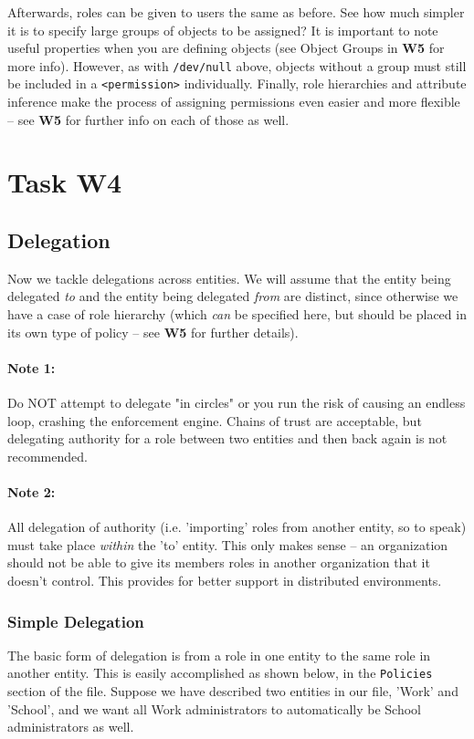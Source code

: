 \documentclass{article}
\providecommand{\task}[1]{\section{Task #1}}
\providecommand{\inlinecode}{\texttt}
\begin{document}
Afterwards, roles can be given to users the same as before. See how much simpler it is to specify large groups of objects to be assigned? It is important to note useful properties when you are defining objects (see Object Groups in \textbf{W5} for more info). However, as with \inlinecode{/dev/null} above, objects without a group must still be included in a \inlinecode{<permission>} individually. Finally, role hierarchies and attribute inference make the process of assigning permissions even easier and more flexible -- see \textbf{W5} for further info on each of those as well.


\task{W4}
\subsection{Delegation}
Now we tackle delegations across entities. We will assume that the entity being delegated \textit{to} and the entity being delegated \textit{from} are distinct, since otherwise we have a case of role hierarchy (which \textit{can} be specified here, but should be placed in its own type of policy -- see \textbf{W5} for further details).
\paragraph{Note 1:} Do NOT attempt to delegate "in circles" or you run the risk of causing an endless loop, crashing the enforcement engine. Chains of trust are acceptable, but delegating authority for a role between two entities and then back again is not recommended.
\paragraph{Note 2:} All delegation of authority (i.e. 'importing' roles from another entity, so to speak) must take place \textit{within} the 'to' entity. This only makes sense -- an organization should not be able to give its members roles in another organization that it doesn't control. This provides for better support in distributed environments.

\subsubsection{Simple Delegation}
The basic form of delegation is from a role in one entity to the same role in another entity. This is easily accomplished as shown below, in the \inlinecode{Policies} section of the file. Suppose we have described two entities in our file, 'Work' and 'School', and we want all Work administrators to automatically be School administrators as well.
\end{document}
